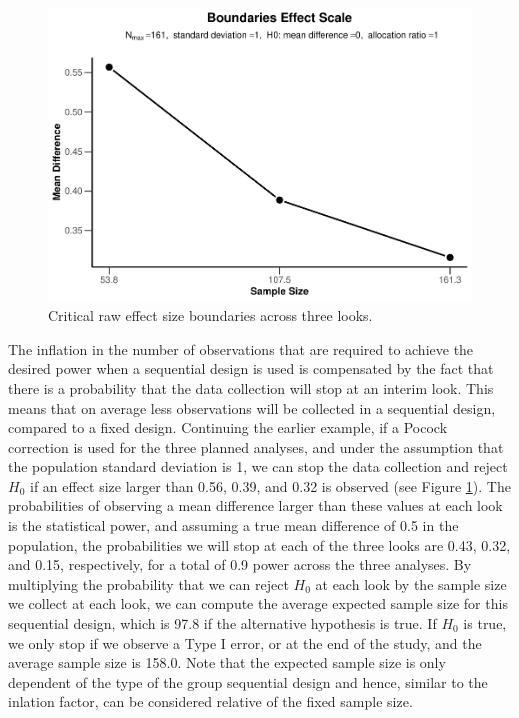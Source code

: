 \documentclass[
  english,
  ,man,floatsintext]{apa6}
\begin{document}
\begin{figure}
\centering
\includegraphics{sequential_tutorial_files/figure-latex/power-bounds-1.pdf}
\caption{\label{fig:power-bounds}Critical raw effect size boundaries across three looks.}
\end{figure}

The inflation in the number of observations that are required to achieve the desired power when a sequential design is used is compensated by the fact that there is a probability that the data collection will stop at an interim look. This means that on average less observations will be collected in a sequential design, compared to a fixed design. Continuing the earlier example, if a Pocock correction is used for the three planned analyses, and under the assumption that the population standard deviation is 1, we can stop the data collection and reject \(H_0\) if an effect size larger than 0.56, 0.39, and 0.32 is observed (see Figure \ref{fig:power-bounds}). The probabilities of observing a mean difference larger than these values at each look is the statistical power, and assuming a true mean difference of 0.5 in the population, the probabilities we will stop at each of the three looks are 0.43, 0.32, and 0.15, respectively, for a total of 0.9 power across the three analyses. By multiplying the probability that we can reject \(H_0\) at each look by the sample size we collect at each look, we can compute the average expected sample size for this sequential design, which is 97.8 if the alternative hypothesis is true. If \(H_0\) is true, we only stop if we observe a Type I error, or at the end of the study, and the average sample size is 158.0. Note that the expected sample size is only dependent of the type of the group sequential design and hence, similar to the inlation factor, can be considered relative of the fixed sample size.
\end{document}

